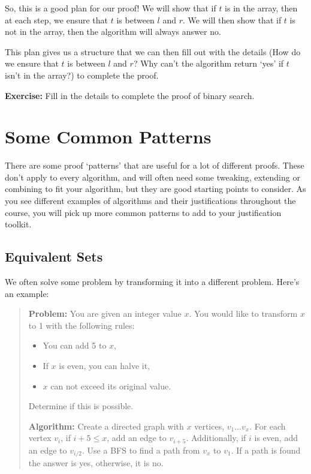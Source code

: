 \documentclass[12pt]{article}
\begin{document}
\begin{question}
So, this is a good plan for our proof! We will show that if $t$ is in the array, then at each step, we ensure that $t$ is between $l$ and $r$. We will then show that if $t$ is not in the array, then the algorithm will always answer no.

This plan gives us a structure that we can then fill out with the details (How do we ensure that $t$ is between $l$ and $r$? Why can't the algorithm return `yes' if $t$ isn't in the array?) to complete the proof.

\textbf{Exercise:} Fill in the details to complete the proof of binary search.

\section*{Some Common Patterns}
There are some proof `patterns' that are useful for a lot of different proofs. These don't apply to every algorithm, and will often need some tweaking, extending or combining to fit your algorithm, but they are good starting points to consider. As you see different examples of algorithms and their justifications throughout the course, you will pick up more common patterns to add to your justification toolkit. 

\subsection*{Equivalent Sets}
We often solve some problem by transforming it into a different problem. Here's an example:
\begin{quote}
    \textbf{Problem:} You are given an integer value $x$. You would like to transform $x$ to 1 with the following rules:
    \begin{itemize}
        \item You can add 5 to $x$,
        \item If $x$ is even, you can halve it,
        \item $x$ can not exceed its original value.
    \end{itemize} 
    Determine if this is possible.
    
    \textbf{Algorithm:} Create a directed graph with $x$ vertices, $v_1 \dots v_x$. For each vertex $v_i$, if $i+5 \leq  x$, add an edge to $v_{i+5}$. Additionally, if $i$ is even, add an edge to $v_{i/2}$. Use a BFS to find a path from $v_x$ to $v_1$. If a path is found the answer is yes, otherwise, it is no.
\end{quote}


\end{question}
\end{document}

